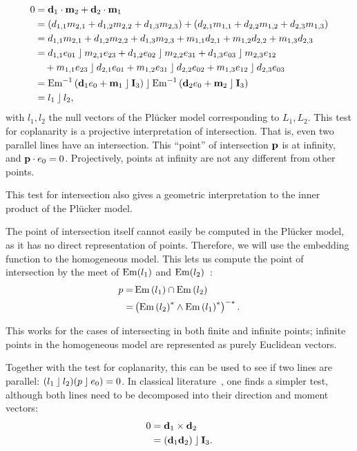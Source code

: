\begin{align}
  \label{eq:coplanar}
  0 &= \mathbf{d}_1 \mathbin{\cdot} \mathbf{m}_2 + \mathbf{d}_2 \mathbin{\cdot} \mathbf{m}_1 \nonumber \\
    &= \left( d_{1,1} m_{2,1} + d_{1,2} m_{2,2} + d_{1,3} m_{2,3} \right) + \left( d_{2,1} m_{1,1} + d_{2,2} m_{1,2} + d_{2,3} m_{1,3} \right) \nonumber \\
    &= d_{1,1} m_{2,1} + d_{1,2} m_{2,2} + d_{1,3} m_{2,3} + m_{1,1} d_{2,1} + m_{1,2} d_{2,2} + m_{1,3} d_{2,3} \nonumber \\
    &= d_{1,1} e_{01} \mathbin{\rfloor} m_{2,1} e_{23} + d_{1,2} e_{02} \mathbin{\rfloor} m_{2,2} e_{31} + d_{1,3} e_{03} \mathbin{\rfloor} m_{2,3} e_{12} \nonumber \\
    &\quad + m_{1,1} e_{23} \mathbin{\rfloor} d_{2,1} e_{01} + m_{1,2} e_{31} \mathbin{\rfloor} d_{2,2} e_{02} + m_{1,3} e_{12} \mathbin{\rfloor} d_{2,3} e_{03} \nonumber \\
    &= \operatorname{Em}^{-1}\left( \mathbf{d}_1e_0 + \mathbf{m}_1 \mathbin{\rfloor} \mathbf{I}_3 \right) \mathbin{\rfloor} \operatorname{Em}^{-1}\left( \mathbf{d}_2e_0 + \mathbf{m}_2 \mathbin{\rfloor} \mathbf{I}_3 \right) \nonumber \\
    &= l_1 \mathbin{\rfloor} l_2,
\end{align}
with $l_1, l_2$ the null vectors of the Pl\"ucker model corresponding to $L_1, L_2$.  This test for coplanarity is a projective interpretation of intersection.  That is, even two parallel lines have an intersection.  This ``point'' of intersection $\mathbf{p}$ is at infinity, and $\mathbf{p} \mathbin{\cdot} e_0 = 0$.  Projectively, points at infinity are not any different from other points.

  This test for intersection also gives a geometric interpretation to the inner product of the Pl\"ucker model.

The point of intersection itself cannot easily be computed in the Pl\"ucker model, as it has no direct representation of points.  Therefore, we will use the embedding function to the homogeneous model.  This lets us compute the point of intersection by the meet of $\operatorname{Em}(l_1)$ and $\operatorname{Em}(l_2)$~\cite[Section 11.7.1]{TheBook}:
\begin{align}
  \label{eq:intersect}
  p =& \operatorname{Em}\left(l_1\right) \cap \operatorname{Em}\left(l_2\right) \nonumber \\
  =& \left(\operatorname{Em}\left(l_2\right)^\ast \wedge \operatorname{Em}\left(l_1\right)^\ast\right)^{-\ast} .
\end{align}

This works for the cases of intersecting in both finite and infinite points; infinite points in the homogeneous model are represented as purely Euclidean vectors.

Together with the test for coplanarity, this can be used to see if two lines are parallel: $(l_1 \mathbin{\rfloor} l_2) (p \mathbin{\rfloor} e_0) = 0$.  In classical literature~\cite{Shoemake}, one finds a simpler test, although both lines need to be decomposed into their direction and moment vectors:
\begin{align*}
  0 &= \mathbf{d}_1 \times \mathbf{d}_2 \\
    &= \left( \mathbf{d}_1 \mathbf{d}_2 \right) \mathbin{\rfloor} \mathbf{I}_3 .
\end{align*}
